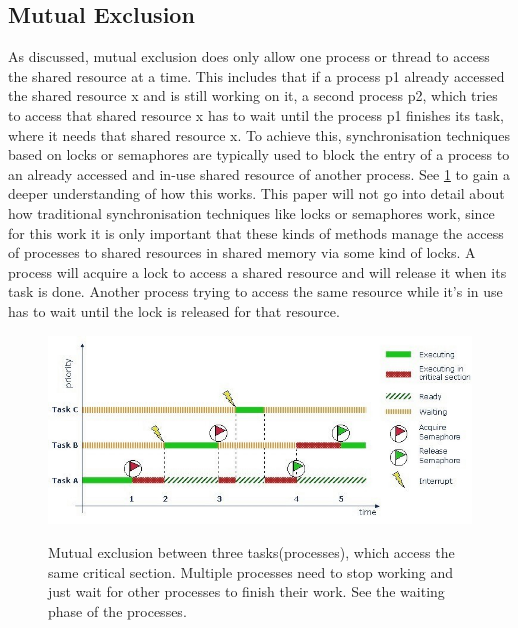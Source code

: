 \subsection{Mutual Exclusion}\label{subsec:mutual-exclusion}

As discussed, mutual exclusion does only allow one process or thread to access the shared resource at a time. This includes that if a process p1 already accessed the shared resource x and is still working on it, a second process p2, which tries to access that shared resource x has to wait until the process p1 finishes its task, where it needs that shared resource x. To achieve this, synchronisation techniques based on locks or semaphores are typically used to block the entry of a process to an already accessed and in-use shared resource of another process. See \cref{fig:mutual-exclusion} to gain a deeper understanding of how this works. This paper will not go into detail about how traditional synchronisation techniques like locks or semaphores work, since for this work it is only important that these kinds of methods manage the access of processes to shared resources in shared memory via some kind of locks. A process will acquire a lock to access a shared resource and will release it when its task is done. Another process trying to access the same resource while it's in use has to wait until the lock is released for that resource.

\begin{figure}[!ht]
    \centering
    \captionsetup{justification=centering}
    \caption{Mutual exclusion between three tasks(processes), which access the same critical section. Multiple processes need to stop working and just wait for other processes to finish their work. See the waiting phase of the processes.}
    \includegraphics[width=135mm]{images/mutual_exclusion.jpg}
    \cite{MutualExclusion}
    \label{fig:mutual-exclusion}
\end{figure}

